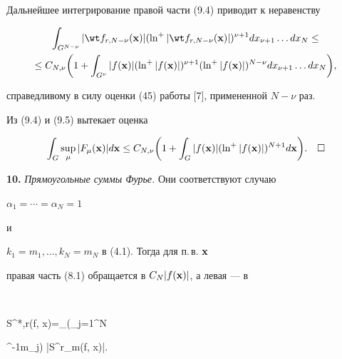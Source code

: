 Дальнейшее интегрирование правой части (9.4) приводит к неравенству


\begin{multline}


\int_{G^{N-\nu}} 


|\wt f_{r,N-\nu}({\bold x})|(\ln^+|\wt f_{r,N-\nu}({\bold x})|)^{\nu+1}


dx_{\nu+1}\dotsc dx_N \le \\


%


\le C_{N,\nu}\bigg(1+\int_{G^{\nu}}|f({\bold x})|


(\ln^+|f({\bold x})|)^{\nu+1} (\ln^+| f({\bold x})|)^{N-\nu}


dx_{\nu+1}\dotsc dx_N\bigg),


\end{multline}


справедливому в силу оценки (45) работы [7], примененной $N-\nu$ раз.


Из (9.4) и (9.5) вытекает оценка


$$


\int_{G} \sup_\mu |F_\mu({\bold x})|d{\bold x}\le


C_{N,\nu}\bigg(1+\int_G


|f({\bold x})|(\ln^+| f({\bold x})|)^{N+1}d{\bold x}\bigg).\quad\square


$$


\medskip





\addtocounter{section}{1}


\setcounter{equation}{0}


\setcounter{lems}{0}


\setcounter{thms}{0}





{\bf 10.} {\it Прямоугольные суммы Фурье.} Они соответствуют случаю


$\alpha_1=\dotsb=\alpha_N=1$


и


$k_1=m_1,\dotsc,k_N=m_N$ в (4.1). Тогда для п.\,в. ${\bold x}$ 


правая часть (8.1) обращается в $C_N| f({\bold x})|$, а левая --- в


$$


S^{*,r}(f, {\bold x})=\limsup_{\mu\to\infty}\bigg(\prod_{j=1}^N


\ln^{-1}m_j\bigg) |\wt S^{r}_{\bold m}(f, {\bold x})|.



